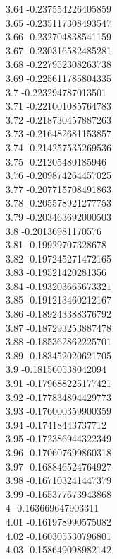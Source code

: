 {3.64	-0.237554226405859\\
3.65	-0.235117308493547\\
3.66	-0.232704838541159\\
3.67	-0.230316582485281\\
3.68	-0.227952308263738\\
3.69	-0.225611785804335\\
3.7	-0.223294787013501\\
3.71	-0.221001085764783\\
3.72	-0.218730457887263\\
3.73	-0.216482681153857\\
3.74	-0.214257535269536\\
3.75	-0.21205480185946\\
3.76	-0.209874264457025\\
3.77	-0.207715708491863\\
3.78	-0.205578921277753\\
3.79	-0.203463692000503\\
3.8	-0.20136981170576\\
3.81	-0.19929707328678\\
3.82	-0.197245271472165\\
3.83	-0.19521420281356\\
3.84	-0.193203665673321\\
3.85	-0.191213460212167\\
3.86	-0.189243388376792\\
3.87	-0.187293253887478\\
3.88	-0.185362862225701\\
3.89	-0.183452020621705\\
3.9	-0.181560538042094\\
3.91	-0.179688225177421\\
3.92	-0.177834894429773\\
3.93	-0.176000359900359\\
3.94	-0.17418443737712\\
3.95	-0.172386944322349\\
3.96	-0.170607699860318\\
3.97	-0.168846524764927\\
3.98	-0.167103241447379\\
3.99	-0.165377673943868\\
4	-0.163669647903311\\
4.01	-0.161978990575082\\
4.02	-0.160305530796801\\
4.03	-0.158649098982142\\
}
